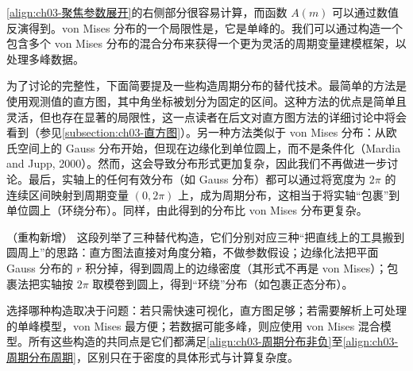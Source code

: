 \documentclass[../../main.tex]{subfiles}
\begin{document}
\eqref{align:ch03-聚焦参数展开}的右侧部分很容易计算，而函数 $A(m)$ 可以通过数值反演得到。von Mises 分布的一个局限性是，它是单峰的。我们可以通过构造一个包含多个 von Mises 分布的混合分布来获得一个更为灵活的周期变量建模框架，以处理多峰数据。

为了讨论的完整性，下面简要提及一些构造周期分布的替代技术。最简单的方法是使用观测值的直方图，其中角坐标被划分为固定的区间。这种方法的优点是简单且灵活，但也存在显著的局限性，这一点读者在后文对直方图方法的详细讨论中将会看到（参见\cref{subsection:ch03-直方图}）。另一种方法类似于 von Mises 分布：从欧氏空间上的 Gauss 分布开始，但现在边缘化到单位圆上，而不是条件化（Mardia and Jupp, 2000）。然而，这会导致分布形式更加复杂，因此我们不再做进一步讨论。最后，实轴上的任何有效分布（如 Gauss 分布）都可以通过将宽度为 $2\pi$ 的连续区间映射到周期变量 $(0,2\pi)$ 上，成为周期分布，这相当于将实轴“包裹”到单位圆上（环绕分布）。同样，由此得到的分布比 von Mises 分布更复杂。

\begin{remark}（重构新增）
这段列举了三种替代构造，它们分别对应三种“把直线上的工具搬到圆周上”的思路：直方图法直接对角度分箱，不做参数假设；边缘化法把平面 Gauss 分布的 $r$ 积分掉，得到圆周上的边缘密度（其形式不再是 von Mises）；包裹法把实轴按 $2\pi$ 取模卷到圆上，得到“环绕”分布（如包裹正态分布）。

选择哪种构造取决于问题：若只需快速可视化，直方图足够；若需要解析上可处理的单峰模型，von Mises 最方便；若数据可能多峰，则应使用 von Mises 混合模型。所有这些构造的共同点是它们都满足\eqref{align:ch03-周期分布非负}至\eqref{align:ch03-周期分布周期}，区别只在于密度的具体形式与计算复杂度。
\end{remark}
\end{document}
